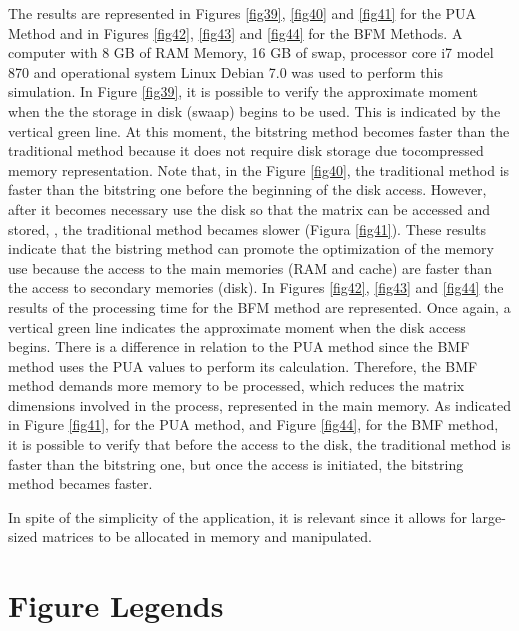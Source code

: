 \documentclass[10pt]{article}
\begin{document}
The results are represented in Figures \ref{fig39}, \ref{fig40} and \ref{fig41} 
for the PUA Method and in Figures 
\ref{fig42}, \ref{fig43} and \ref{fig44} for the 
BFM Methods.  A computer with 8 GB of RAM Memory, 16 GB of swap, processor core 
i7 model 870
and operational 
system Linux Debian 7.0 was used to perform this simulation. In Figure 
\ref{fig39}, it is possible to verify the approximate 
moment  when the  the storage in disk (swaap) begins to be used. This is 
indicated by the vertical green line. 
At this moment, the bitstring method becomes faster than the traditional method 
because it does not require disk 
storage due tocompressed memory representation. Note that, in the Figure 
\ref{fig40}, the traditional method is faster 
than the bitstring one before the beginning of the disk access. However, after 
it becomes necessary use the disk 
so that the matrix can be accessed and stored, , the traditional method  becames 
slower (Figura \ref{fig41}). 
These results 
indicate that the bistring method can promote the optimization of the memory use 
because the access to the main 
memories (RAM and cache) are faster than the access to secondary memories 
(disk). In Figures \ref{fig42}, 
\ref{fig43} and \ref{fig44} the 
results of the processing time for  the BFM method are represented. Once again, 
a vertical green line indicates 
the approximate moment when the disk access begins. There is a difference in 
relation to the PUA method since the 
BMF method uses the PUA values to perform its calculation. Therefore, the BMF 
method demands more memory to be 
processed, which reduces the matrix dimensions involved in the process, 
represented in the main memory. As 
indicated in Figure \ref{fig41}, for the PUA method, and Figure \ref{fig44}, for 
the BMF method, it is possible 
to verify that 
before the access to the disk, the traditional method is faster than the 
bitstring one, but once the access 
is initiated,  the bitstring method becames faster.

In spite of the simplicity of the application, it is relevant since  it allows 
for large-sized matrices to be 
allocated in memory and manipulated.

\newpage

\section*{Figure Legends}
\end{document}
